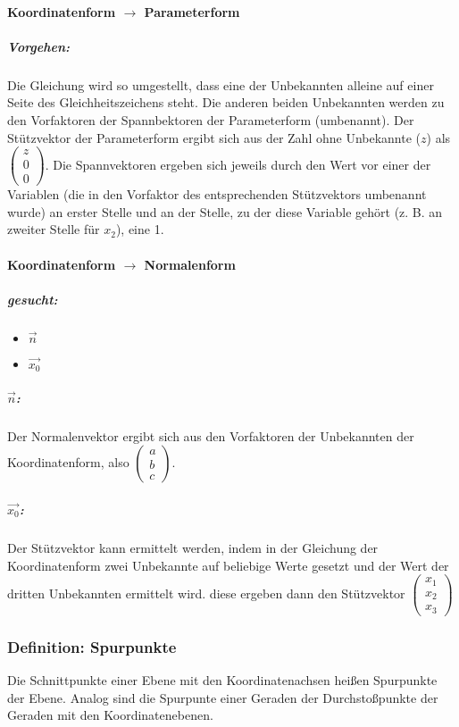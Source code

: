 \documentclass{article}
\begin{document}
  \paragraph{Koordinatenform $\rightarrow$ Parameterform} 
  \subparagraph{Vorgehen:}
  Die Gleichung wird so umgestellt, dass eine der Unbekannten alleine auf einer Seite des Gleichheitszeichens steht. Die anderen beiden Unbekannten werden zu den Vorfaktoren der Spannbektoren der Parameterform (umbenannt). Der Stützvektor der Parameterform ergibt sich aus der Zahl ohne Unbekannte ($z$) als 
  $\begin{pmatrix}
  	z \\
  	0 \\
  	0
  \end{pmatrix}$. 
  Die Spannvektoren ergeben sich jeweils durch den Wert vor einer der Variablen (die in den Vorfaktor des entsprechenden Stützvektors umbenannt wurde) an erster Stelle und an der Stelle, zu der diese Variable gehört (z. B. an zweiter Stelle für $x_2$), eine 1.
  
  \paragraph{Koordinatenform $\rightarrow$ Normalenform}
  \subparagraph{gesucht:} 
  \begin{itemize}
  	\item $\vec{n}$
  	\item $\vec{x_0}$
  \end{itemize}
  
  \subparagraph{$\vec{n}$:}
  Der Normalenvektor ergibt sich aus den Vorfaktoren der Unbekannten der Koordinatenform, also 
  $\begin{pmatrix}
  	a \\
  	b \\
  	c
  \end{pmatrix}$. 
  
  \subparagraph{$\vec{x_0}$:}
  Der Stützvektor kann ermittelt werden, indem in der Gleichung der Koordinatenform zwei Unbekannte auf beliebige Werte gesetzt und der Wert der dritten Unbekannten ermittelt wird. diese ergeben dann den Stützvektor 
  $\begin{pmatrix}
  	x_1 \\
  	x_2 \\
  	x_3
  \end{pmatrix}$
  
  \subsubsection{Definition: Spurpunkte}
  Die Schnittpunkte einer Ebene mit den Koordinatenachsen heißen Spurpunkte der Ebene. Analog sind die Spurpunte einer Geraden der Durchstoßpunkte der Geraden mit den Koordinatenebenen.
  
\end{document}
